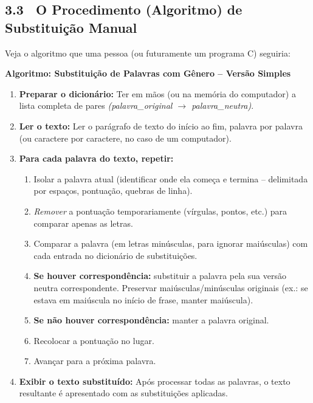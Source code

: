 \documentclass[12pt,a4paper]{article}
\begin{document}
\bigskip

\subsection*{3.3 \ O Procedimento (Algoritmo) de Substituição Manual}

Veja o algoritmo que uma pessoa (ou futuramente um programa C) seguiria:

\begin{algoritmo}
\textbf{Algoritmo: Substituição de Palavras com Gênero -- Versão Simples}

\begin{enumerate}
  \item \textbf{Preparar o dicionário:} Ter em mãos (ou na memória do computador)
  a lista completa de pares \textit{(palavra\_original $\to$ palavra\_neutra)}.

  \item \textbf{Ler o texto:} Ler o parágrafo de texto do início ao fim,
  palavra por palavra (ou caractere por caractere, no caso de um computador).

  \item \textbf{Para cada palavra do texto, repetir:}
  \begin{enumerate}[label=\arabic*.]
    \item Isolar a palavra atual (identificar onde ela começa e termina --
    delimitada por espaços, pontuação, quebras de linha).
    \item \textit{Remover} a pontuação temporariamente (vírgulas, pontos, etc.)
    para comparar apenas as letras.
    \item Comparar a palavra (em letras minúsculas, para ignorar maiúsculas)
    com cada entrada no dicionário de substituições.
    \item \textbf{Se houver correspondência:} substituir a palavra pela sua
    versão neutra correspondente. Preservar maiúsculas/minúsculas originais
    (ex.: se estava em maiúscula no início de frase, manter maiúscula).
    \item \textbf{Se não houver correspondência:} manter a palavra original.
    \item Recolocar a pontuação no lugar.
    \item Avançar para a próxima palavra.
  \end{enumerate}

  \item \textbf{Exibir o texto substituído:} Após processar todas as palavras,
  o texto resultante é apresentado com as substituições aplicadas.
\end{enumerate}
\end{algoritmo}
\end{document}
